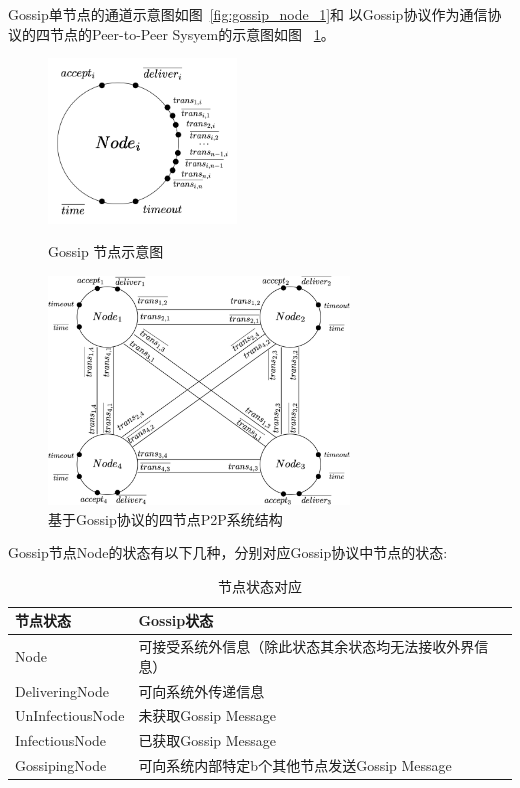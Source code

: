 Gossip单节点的通道示意图如图~\ref{fig:gossip_node_1}和
以Gossip协议作为通信协议的四节点的Peer-to-Peer Sysyem的示意图如图
~\ref{fig:p2p_system}。

\begin{figure}[!htp]
   \begin{minipage}{0.3\textwidth}
   \centering
   \includegraphics[width=5cm]{../figure/Node_gossip2.png}
   \caption{Gossip 节点示意图}
  \label{fig:gossip_node_1}
\end{minipage}\hfill
\begin{minipage}{0.6\textwidth}
   \includegraphics[width=8cm]{../figure/GossipSystem.png}
   \caption{基于Gossip协议的四节点P2P系统结构}
   \label{fig:p2p_system}
\end{minipage}
 \end{figure}

Gossip节点Node的状态有以下几种，分别对应Gossip协议中节点的状态:
\begin{table}[!hpt]
    \caption{节点状态对应}
    \label{tab:firstone}
    \centering
    \begin{tabular}{@{}llr@{}} \toprule
      节点状态 & Gossip状态 \\ \midrule
      Node&可接受系统外信息（除此状态其余状态均无法接收外界信息）\\
      DeliveringNode&可向系统外传递信息\\
      UnInfectiousNode&未获取Gossip Message\\
      InfectiousNode&已获取Gossip Message\\
      GossipingNode&可向系统内部特定b个其他节点发送Gossip Message\\ \bottomrule
    \end{tabular}
  \end{table}


